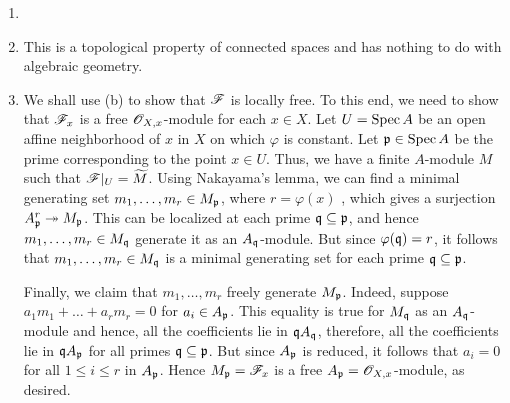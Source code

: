 \begin{exercise}\hfill 
\begin{enumerate}[label=(\alph*)]
    \item 
    \item This is a topological property of connected spaces and has nothing to do with algebraic geometry.
    \item We shall use  (b) to show that $\mathscr{F}$ is locally free. To this end, we need to show that $\mathscr{F}_x$ is a free $\mathscr{O}_{X, x}$-module for each $x\in X$. Let $U = \operatorname{Spec} A$ be an open affine neighborhood of $x$ in $X$ on which $\varphi$ is constant. Let $\mathfrak{p}\in\operatorname{Spec} A$ be the prime corresponding to the point $x\in U$. Thus, we have a finite $A$-module $M$ such that $\mathscr{F}|_{U} = \widetilde{M}$. Using Nakayama's lemma, we can find a minimal generating set $m_1,\dots,m_r\in M_{\mathfrak{p}}$, where $r = \varphi(x)$ , which gives a surjection $A_{\mathfrak{p}}^r\twoheadrightarrow M_{\mathfrak{p}}$. This can be localized at each prime $\mathfrak{q}\subseteq\mathfrak{p}$, and hence $m_1,\dots,m_r\in M_{\mathfrak{q}}$ generate it as an $A_{\mathfrak{q}}$-module. But since $\varphi(\mathfrak{q}) = r$, it follows that $m_1,\dots,m_r\in M_{\mathfrak{q}}$ is a minimal generating set for each prime $\mathfrak{q}\subseteq\mathfrak{p}$.

    Finally, we claim that $m_1,\dots,m_r$ freely generate $M_{\mathfrak{p}}$. Indeed, suppose $a_1m_1 + \dots + a_rm_r = 0$ for $a_i\in A_{\mathfrak{p}}$. This equality is true for $M_{\mathfrak{q}}$ as an $A_{\mathfrak{q}}$-module and hence, all the coefficients lie in $\mathfrak{q} A_{\mathfrak{q}}$, therefore, all the coefficients lie in $\mathfrak{q} A_{\mathfrak{p}}$ for all primes $\mathfrak{q}\subseteq\mathfrak{p}$. But since $A_{\mathfrak{p}}$ is reduced, it follows that $a_i = 0$ for all $1\le i\le r$ in $A_{\mathfrak{p}}$. Hence $M_{\mathfrak{p}} = \mathscr{F}_x$ is a free $A_{\mathfrak{p}} = \mathscr{O}_{X, x}$-module, as desired.
\end{enumerate}
\end{exercise}